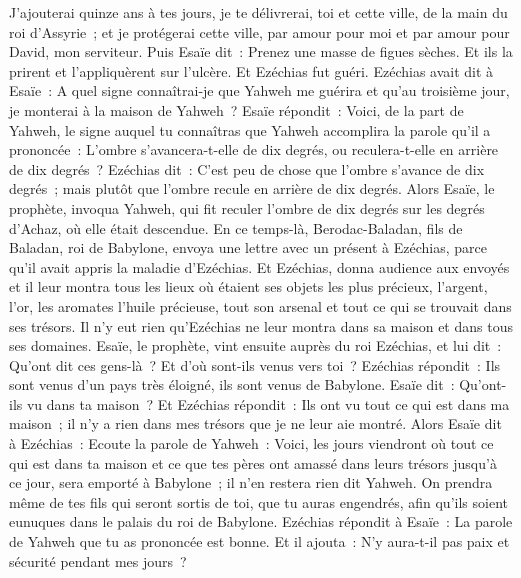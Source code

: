 \begin{multicols}{2}
J'ajouterai quinze ans à tes jours, je te délivrerai, toi et cette ville, de la main du roi d'Assyrie~; et je protégerai cette ville, par amour pour moi et par amour pour David, mon serviteur.
Puis Esaïe dit~: Prenez une masse de figues sèches. Et ils la prirent et l'appliquèrent sur l'ulcère. Et Ezéchias fut guéri.
Ezéchias avait dit à Esaïe~: A quel signe connaîtrai-je que Yahweh me guérira et qu'au troisième jour, je monterai à la maison de Yahweh~?
Esaïe répondit~: Voici, de la part de Yahweh, le signe auquel tu connaîtras que Yahweh accomplira la parole qu'il a prononcée~: L'ombre s'avancera-t-elle de dix degrés, ou reculera-t-elle en arrière de dix degrés~?
Ezéchias dit~: C'est peu de chose que l'ombre s'avance de dix degrés~; mais plutôt que l'ombre recule en arrière de dix degrés.
Alors Esaïe, le prophète, invoqua Yahweh, qui fit reculer l'ombre de dix degrés sur les degrés d'Achaz, où elle était descendue.
En ce temps-là, Berodac-Baladan, fils de Baladan, roi de Babylone, envoya une lettre avec un présent à Ezéchias, parce qu'il avait appris la maladie d'Ezéchias.
Et Ezéchias, donna audience aux envoyés et il leur montra tous les lieux où étaient ses objets les plus précieux, l'argent, l'or, les aromates l'huile précieuse, tout son arsenal et tout ce qui se trouvait dans ses trésors. Il n'y eut rien qu'Ezéchias ne leur montra dans sa maison et dans tous ses domaines.
Esaïe, le prophète, vint ensuite auprès du roi Ezéchias, et lui dit~: Qu'ont dit ces gens-là~? Et d'où sont-ils venus vers toi~? Ezéchias répondit~: Ils sont venus d'un pays très éloigné, ils sont venus de Babylone.
Esaïe dit~: Qu'ont-ils vu dans ta maison~? Et Ezéchias répondit~: Ils ont vu tout ce qui est dans ma maison~; il n'y a rien dans mes trésors que je ne leur aie montré.
Alors Esaïe dit à Ezéchias~: Ecoute la parole de Yahweh~:
Voici, les jours viendront où tout ce qui est dans ta maison et ce que tes pères ont amassé dans leurs trésors jusqu'à ce jour, sera emporté à Babylone~; il n'en restera rien dit Yahweh.
On prendra même de tes fils qui seront sortis de toi, que tu auras engendrés, afin qu'ils soient eunuques dans le palais du roi de Babylone.
Ezéchias répondit à Esaïe~: La parole de Yahweh que tu as prononcée est bonne. Et il ajouta~: N'y aura-t-il pas paix et sécurité pendant mes jours~?

\end{multicols}
